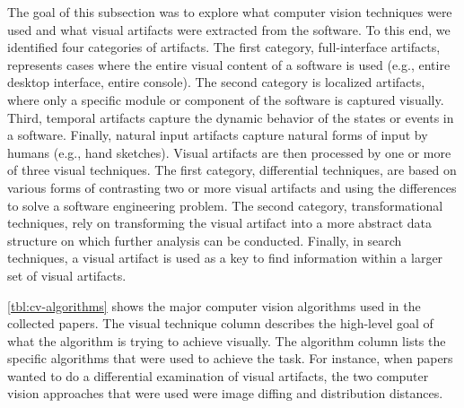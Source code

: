 The goal of this subsection was to explore what computer vision techniques
were used and what visual artifacts were extracted from the software.
To this end, we identified four categories of artifacts.
The first category, full-interface artifacts, represents cases
where the entire visual content of a software is used (e.g.,  entire desktop interface, entire console).
The second category is localized artifacts, where only a specific module
or component of the software is captured visually. 
Third, temporal artifacts capture the dynamic behavior of the states or events in a software. Finally, natural input artifacts capture natural forms of input by humans (e.g.,  hand sketches).
%
Visual artifacts are then processed by one or more of three visual techniques.
The first category, differential techniques, are based on various forms of contrasting two or more visual artifacts and using the differences to solve a software engineering problem.
The second category, transformational techniques, rely on transforming the visual artifact into a more abstract data structure on which further analysis can be conducted.
Finally, in search techniques, a visual artifact is used as a key to find information within a larger set of visual artifacts.

\autoref{tbl:cv-algorithms} shows the major computer vision algorithms used in the collected papers.
The visual technique column describes the high-level goal of what the algorithm is trying to achieve visually.
The algorithm column lists the specific algorithms that were used to achieve the task.
For instance, when papers wanted to do a differential examination of visual artifacts, the two computer vision approaches that were used were image diffing and distribution distances.


